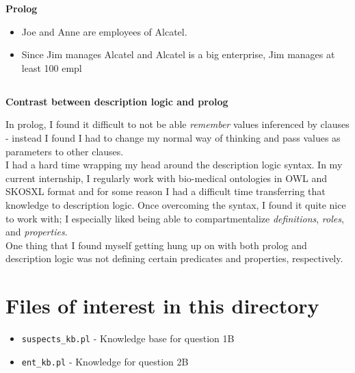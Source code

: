 \documentclass[11pt]{article}
\begin{document}
\textbf{Prolog}
\begin{itemize}
    \item Joe and Anne are employees of Alcatel. 
    \item Since Jim manages Alcatel and Alcatel is a big enterprise, Jim manages at least 100 empl         

\end{itemize}

\subsection{}
\textbf{Contrast between description logic and prolog}

In prolog, I found it difficult to not be able \textit{remember} values inferenced by clauses - instead I found I had to change my normal way of thinking and pass values as parameters to other clauses. \\ 

I had a hard time wrapping my head around the description logic syntax. In my current internship, I regularly work with bio-medical ontologies in OWL and SKOSXL format and for some reason I had a difficult time transferring that knowledge to description logic. Once overcoming the syntax, I found it quite nice to work with; I especially liked being able to compartmentalize \textit{definitions}, \textit{roles}, and \textit{properties}. \\ 

One thing that I found myself getting hung up on with both prolog and description logic was not defining certain predicates and properties, respectively. \\ 

\section{Files of interest in this directory}
\begin{itemize}
\item \texttt{suspects\_kb.pl} - Knowledge base  for question 1B 
\item \texttt{ent\_kb.pl} - Knowledge for question 2B

\end{itemize}
\end{document}

